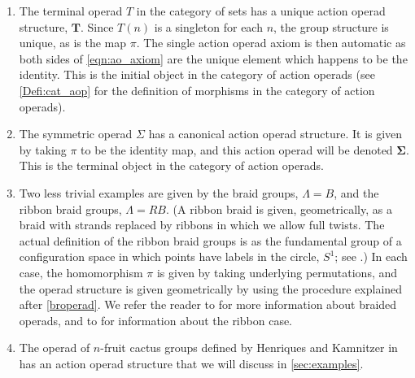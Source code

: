 \begin{example}
\begin{enumerate}
\item The terminal operad $T$ in the category of sets has a unique action operad structure, $\mathbf{T}$. Since $T(n)$ is a singleton for each $n$, the group structure is unique, as is the map $\pi$. The single action operad axiom is then automatic as both sides of \cref{eqn:ao_axiom} are the unique element which happens to be the identity. This is the initial object in the category of action operads (see \cref{Defi:cat_aop} for the definition of morphisms in the category of action operads).
\item The symmetric operad $\Sigma$ has a canonical action operad structure. It is given by taking $\pi$ to be the identity map, and this action operad will be denoted $\mathbf{\Sigma}$. This is the terminal object in the category of action operads.
\item Two less trivial examples are given by the braid groups, $\Lambda = B$, and the ribbon braid groups, $\Lambda = RB$. (A ribbon braid is given, geometrically, as a braid with strands replaced by ribbons in which we allow full twists. The actual definition of the ribbon braid groups is as the fundamental group of a configuration space in which points have labels in the circle, $S^{1}$; see \cite{sal-wahl}.)  In each case, the homomorphism $\pi$ is given by taking underlying permutations, and the operad structure is given geometrically by using the procedure explained after \cref{broperad}. We refer the reader to \cite{fie-br} for more information about braided operads, and to \cite{sal-wahl, wahl-thesis} for information about the ribbon case.
\item The operad of $n$-fruit cactus groups defined by Henriques and Kamnitzer in \cite{hk-cobound} has an action operad structure that we will discuss in \cref{sec:examples}.
\end{enumerate}
\end{example}

